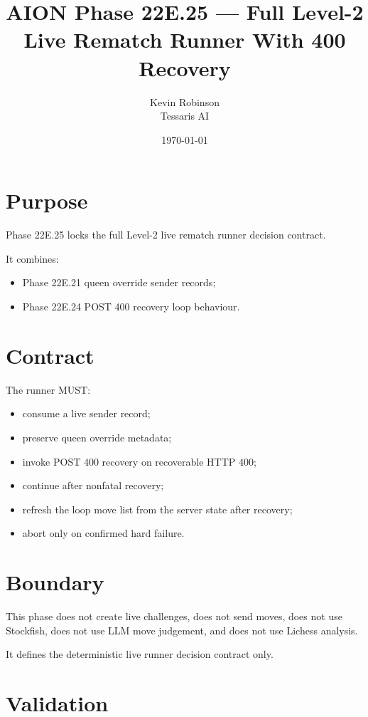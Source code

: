 \documentclass[11pt,a4paper]{article}
\title{\textbf{AION Phase 22E.25 --- Full Level-2 Live Rematch Runner With 400 Recovery}}
\author{Kevin Robinson\\Tessaris AI}
\date{\today}
\begin{document}
\maketitle

\section{Purpose}

Phase 22E.25 locks the full Level-2 live rematch runner decision contract.

It combines:

\begin{itemize}[leftmargin=*]
  \item Phase 22E.21 queen override sender records;
  \item Phase 22E.24 POST 400 recovery loop behaviour.
\end{itemize}

\section{Contract}

The runner MUST:

\begin{itemize}[leftmargin=*]
  \item consume a live sender record;
  \item preserve queen override metadata;
  \item invoke POST 400 recovery on recoverable HTTP 400;
  \item continue after nonfatal recovery;
  \item refresh the loop move list from the server state after recovery;
  \item abort only on confirmed hard failure.
\end{itemize}

\section{Boundary}

This phase does not create live challenges, does not send moves, does not use Stockfish, does not use LLM move judgement, and does not use Lichess analysis.

It defines the deterministic live runner decision contract only.

\section{Validation}
\end{document}
